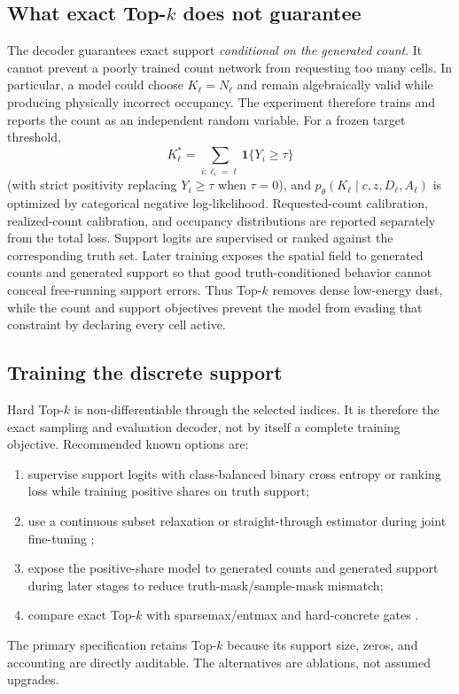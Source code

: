 \documentclass[11pt]{article}
\theoremstyle{definition}
\theoremstyle{remark}
\newcommand{\ind}{\mathbf{1}}
\begin{document}
\subsection{What exact \texorpdfstring{Top-$k$}{Top-k} does not guarantee}
The decoder guarantees exact support \emph{conditional on the generated count}. It cannot prevent a poorly trained count network from requesting too many cells. In particular, a model could choose $K_\ell=N_\ell$ and remain algebraically valid while producing physically incorrect occupancy. The experiment therefore trains and reports the count as an independent random variable. For a frozen target threshold,
\begin{equation}
  K_\ell^{*}=\sum_{i:\ell_i=\ell}\ind\{Y_i\ge\tau\}
\end{equation}
(with strict positivity replacing $Y_i\ge\tau$ when $\tau=0$), and $p_\theta(K_\ell\mid c,z,D_\ell,A_\ell)$ is optimized by categorical negative log-likelihood. Requested-count calibration, realized-count calibration, and occupancy distributions are reported separately from the total loss. Support logits are supervised or ranked against the corresponding truth set. Later training exposes the spatial field to generated counts and generated support so that good truth-conditioned behavior cannot conceal free-running support errors. Thus Top-$k$ removes dense low-energy dust, while the count and support objectives prevent the model from evading that constraint by declaring every cell active.

\subsection{Training the discrete support}
Hard Top-$k$ is non-differentiable through the selected indices. It is therefore the exact sampling and evaluation decoder, not by itself a complete training objective. Recommended known options are:
\begin{enumerate}[leftmargin=2em]
  \item supervise support logits with class-balanced binary cross entropy or ranking loss while training positive shares on truth support;
  \item use a continuous subset relaxation or straight-through estimator during joint fine-tuning \citep{relaxedsubset};
  \item expose the positive-share model to generated counts and generated support during later stages to reduce truth-mask/sample-mask mismatch;
  \item compare exact Top-$k$ with sparsemax/entmax and hard-concrete gates \citep{sparsemax,entmax,hardconcrete}.
\end{enumerate}
The primary specification retains Top-$k$ because its support size, zeros, and accounting are directly auditable. The alternatives are ablations, not assumed upgrades.
\end{document}
